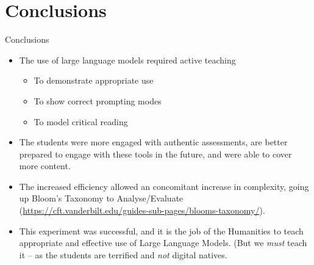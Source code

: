 \documentclass[xcolor={dvipsnames},aspectratio=169]{beamer}
\begin{document}
\section{Conclusions}
\begin{frame}{Conclusions}
\begin{itemize}
\item The use of large language models required active teaching
\begin{itemize}
    \item To demonstrate appropriate use
    \item To show correct prompting modes
    \item To model critical reading
\end{itemize}
\item The students were more engaged with authentic assessments, are better prepared to engage with these tools in the future, and were able to cover more content. 
\item The increased efficiency allowed an concomitant increase in complexity, going up Bloom's Taxonomy to Analyse/Evaluate (\url{https://cft.vanderbilt.edu/guides-sub-pages/blooms-taxonomy/}). 
\item This experiment was successful, and it is the job of the Humanities to teach appropriate and effective use of Large Language Models. (But we \textit{must} teach it -- as the students are terrified and \textit{not} digital natives.
\end{itemize}
\end{frame}






\end{document}
